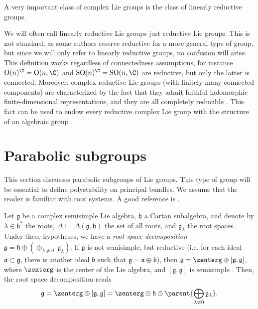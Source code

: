 A very important class of complex Lie groups is the class of linearly reductive groups. 


We will often call linearly reductive Lie groups just reductive Lie groups. This is not standard, as some authors reserve reductive for a more general type of group, but since we will only refer to linearly reductive groups, no confusion will arise. This definition works regardless of connectedness assumptions, for instance \(\mathrm{O}(n)^\C=\mathrm{O}(n,\C)\) and \(\mathrm{SO}(n)^\C=\mathrm{SO}(n,\C)\) are reductive, but only the latter is connected. Moreover, complex reductive Lie groups (with finitely many connected components) are characterized by the fact that they admit faithful holomorphic finite-dimensional representations, and they are all completely reducible \parencite[Th. 15.3.11]{hilgert2011structure}. This fact can be used to endow every reductive complex Lie group with the structure of an algebraic group \parencite[III. 8]{bröcker2003representations}.

\section{Parabolic subgroups}
This section discusses parabolic subgroups of Lie groups. This type of group will be essential to define polystability on principal bundles. We assume that the reader is familiar with root systems. A good reference is \parencite[Ch. 6]{hilgert2011structure}. 

Let \(\mathfrak{g}\) be a complex semisimple Lie algebra, \(\mathfrak{h}\) a Cartan subalgebra, and denote by \(\lambda\in \mathfrak{h}^*\) the roots, \(\Delta:=\Delta(\mathfrak{g}, \mathfrak{h})\) the set of all roots, and \(\mathfrak{g}_\lambda\) the root spaces. Under these hypotheses, we have a \textit{root space decomposition} \(\mathfrak{g}=\mathfrak{h} \oplus (\oplus_{\lambda \neq 0}\ \mathfrak{g}_\lambda)\). If \(\mathfrak{g}\) is not semisimple, but reductive (i.e. for each ideal \(\mathfrak{a} \subset \mathfrak{g}\), there is another ideal \(\mathfrak{b}\) such that \(\mathfrak{g}=\mathfrak{a}\oplus \mathfrak{b}\)), then \(\mathfrak{g}=\zenterg\oplus [\mathfrak{g}, \mathfrak{g}]\), where \(\zenterg\) is the center of the Lie algebra, and \([\mathfrak{g}, \mathfrak{g}]\) is semisimple \parencite[Lemma 5.7.2]{hilgert2011structure}. Then, the root space decomposition reads 
\[
\mathfrak{g}=\zenterg \oplus [\mathfrak{g}, \mathfrak{g}]=\zenterg \oplus \mathfrak{h} \oplus \parent{\bigoplus_{\lambda \neq 0} \mathfrak{g}_\lambda}.
\]

